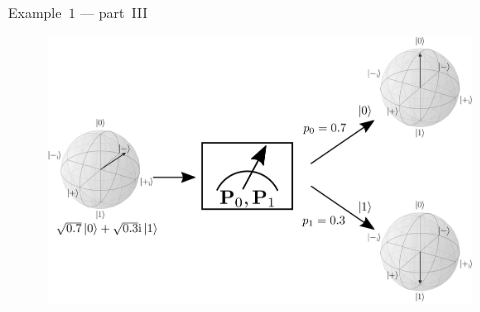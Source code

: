         \begin{frame}{Example~$1$ --- part~III}
            \begin{figure}
                \includegraphics[scale=0.2]{pics/pomiar_sz}
            \end{figure}
        \end{frame}
